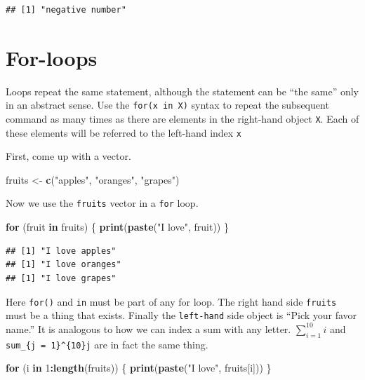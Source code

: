 \documentclass[
]{book}
\newenvironment{Shaded}{\begin{snugshade}}{\end{snugshade}}
\newcommand{\ControlFlowTok}[1]{\textcolor[rgb]{0.13,0.29,0.53}{\textbf{#1}}}
\newcommand{\DecValTok}[1]{\textcolor[rgb]{0.00,0.00,0.81}{#1}}
\newcommand{\KeywordTok}[1]{\textcolor[rgb]{0.13,0.29,0.53}{\textbf{#1}}}
\newcommand{\NormalTok}[1]{#1}
\newcommand{\OperatorTok}[1]{\textcolor[rgb]{0.81,0.36,0.00}{\textbf{#1}}}
\newcommand{\StringTok}[1]{\textcolor[rgb]{0.31,0.60,0.02}{#1}}
\theoremstyle{definition}
\theoremstyle{definition}
\theoremstyle{definition}
\theoremstyle{definition}
\theoremstyle{remark}
\begin{document}
\begin{verbatim}
## [1] "negative number"
\end{verbatim}

\hypertarget{for-loops}{%
\section{For-loops}\label{for-loops}}

Loops repeat the same statement, although the statement can be ``the same'' only in an abstract sense. Use the \texttt{for(x\ in\ X)} syntax to repeat the subsequent command as many times as there are elements in the right-hand object \texttt{X}. Each of these elements will be referred to the left-hand index \texttt{x}

First, come up with a vector.

\begin{Shaded}
\begin{Highlighting}[]
\NormalTok{fruits <-}\StringTok{ }\KeywordTok{c}\NormalTok{(}\StringTok{"apples"}\NormalTok{, }\StringTok{"oranges"}\NormalTok{, }\StringTok{"grapes"}\NormalTok{)}
\end{Highlighting}
\end{Shaded}

Now we use the \texttt{fruits} vector in a \texttt{for} loop.

\begin{Shaded}
\begin{Highlighting}[]
\ControlFlowTok{for}\NormalTok{ (fruit }\ControlFlowTok{in}\NormalTok{ fruits) \{}
  \KeywordTok{print}\NormalTok{(}\KeywordTok{paste}\NormalTok{(}\StringTok{"I love"}\NormalTok{, fruit))}
\NormalTok{\}}
\end{Highlighting}
\end{Shaded}

\begin{verbatim}
## [1] "I love apples"
## [1] "I love oranges"
## [1] "I love grapes"
\end{verbatim}

Here \texttt{for()} and \texttt{in} must be part of any for loop. The right hand side \texttt{fruits} must be a thing that exists. Finally the \texttt{left-hand} side object is ``Pick your favor name.'' It is analogous to how we can index a sum with any letter. \(\sum_{i=1}^{10}i\) and \texttt{sum\_\{j\ =\ 1\}\^{}\{10\}j} are in fact the same thing.

\begin{Shaded}
\begin{Highlighting}[]
\ControlFlowTok{for}\NormalTok{ (i }\ControlFlowTok{in} \DecValTok{1}\OperatorTok{:}\KeywordTok{length}\NormalTok{(fruits)) \{}
  \KeywordTok{print}\NormalTok{(}\KeywordTok{paste}\NormalTok{(}\StringTok{"I love"}\NormalTok{, fruits[i]))}
\NormalTok{\}}
\end{Highlighting}
\end{Shaded}
\end{document}
